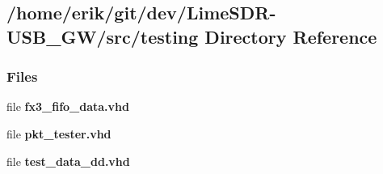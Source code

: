 \subsection{/home/erik/git/dev/\+Lime\+S\+D\+R-\/\+U\+S\+B\+\_\+\+G\+W/src/testing Directory Reference}
\label{dir_9e0ca4651ccf35b37b3c0f3fc8008ce1}
\subsubsection*{Files}
\begin{DoxyCompactItemize}
\item 
file {\bf fx3\+\_\+fifo\+\_\+data.\+vhd}
\item 
file {\bf pkt\+\_\+tester.\+vhd}
\item 
file {\bf test\+\_\+data\+\_\+dd.\+vhd}
\end{DoxyCompactItemize}
